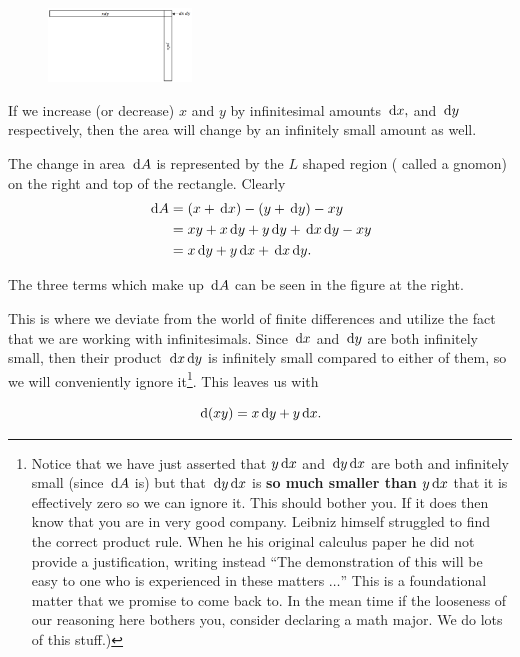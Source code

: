 \begin{figure}
\captionsetup{labelformat=empty}
\centerline{\includegraphics*[height=.75in,width=1.5in]{Figures/gnomon1}}
\label{fig:}
\end{figure}
If we increase (or decrease) $x$ and $y$ by infinitesimal amounts $\thinspace{\rm d}x,$ and $\thinspace{\rm d}y$
respectively, then the area will change by an infinitely small amount
as well.

The change in area $\thinspace{\rm d}A$ is represented by the $L$ shaped region (
called a gnomon) on the right and top of the rectangle. Clearly
\begin{align*}
\thinspace{\rm d}A&=(x+\thinspace{\rm d}x)-(y+\thinspace{\rm d}y)-xy\\
    &=xy+x\thinspace{\rm d}y+y\thinspace{\rm d}y+\thinspace{\rm d}x \thinspace{\rm d}y-xy\\
    &=x\thinspace{\rm d}y+y\thinspace{\rm d}x+\thinspace{\rm d}x \thinspace{\rm d}y.
\end{align*}

The three terms which make up $\thinspace{\rm d}A$ can be seen in the figure at the
right.


This is where we deviate from the world of finite differences and
utilize the fact that we are working with infinitesimals.  Since
$\thinspace{\rm d}x$ and $\thinspace{\rm d}y$ are both infinitely small, then their product
$\thinspace{\rm d}x\thinspace{\rm d}y$ is infinitely small compared to either of them, so we will
conveniently ignore it\footnote{Notice that we have just asserted that
  $y\thinspace{\rm d}x$ and $\thinspace{\rm d}y\thinspace{\rm d}x$ are both and infinitely small (since
  $\thinspace{\rm d}A$ is) but that $\thinspace{\rm d}y\thinspace{\rm d}x$ is {\bf so much smaller than
    $y\thinspace{\rm d}x$} that it is effectively zero so we can ignore it. This
  should bother you. If it does then know that you are in very good
  company.  Leibniz himself struggled to find the correct product
  rule. When he his original calculus paper he did not provide a
  justification, writing instead ``The demonstration of this will be
  easy to one who is experienced in these matters $\ldots$'' This is a
  foundational matter that we promise to come back to. In the mean
  time if the looseness of our reasoning here bothers you, consider
  declaring a math major. We do lots of this stuff.)}.  This leaves us with

$$
\thinspace{\rm d}(xy)=x \thinspace{\rm d}y+y \thinspace{\rm d}x.
$$




